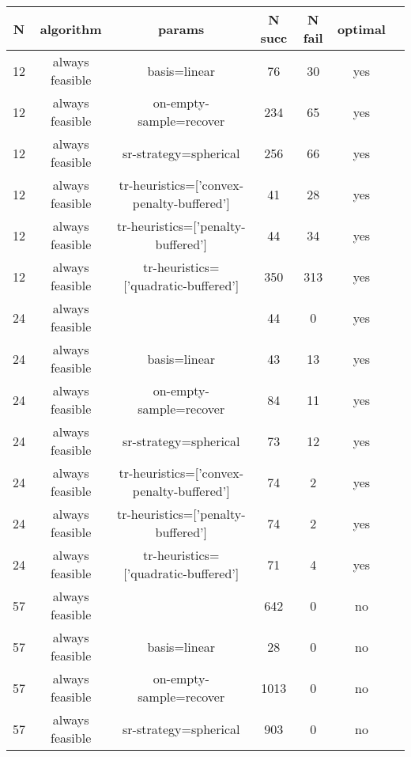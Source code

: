 \begin{footnotesize}
\begin{center}
\begin{longtable}{ccccccc}
  N &       algorithm &                                    params & N succ & N fail & optimal\\
\hline
\endhead
 12 & always feasible &                              basis=linear &     76 &     30 &     yes\\
 12 & always feasible &                   on-empty-sample=recover &    234 &     65 &     yes\\
 12 & always feasible &                     sr-strategy=spherical &    256 &     66 &     yes\\
 12 & always feasible & tr-heuristics=['convex-penalty-buffered'] &     41 &     28 &     yes\\
 12 & always feasible &        tr-heuristics=['penalty-buffered'] &     44 &     34 &     yes\\
 12 & always feasible &      tr-heuristics=['quadratic-buffered'] &    350 &    313 &     yes\\
 24 & always feasible &                                           &     44 &      0 &     yes\\
 24 & always feasible &                              basis=linear &     43 &     13 &     yes\\
 24 & always feasible &                   on-empty-sample=recover &     84 &     11 &     yes\\
 24 & always feasible &                     sr-strategy=spherical &     73 &     12 &     yes\\
 24 & always feasible & tr-heuristics=['convex-penalty-buffered'] &     74 &      2 &     yes\\
 24 & always feasible &        tr-heuristics=['penalty-buffered'] &     74 &      2 &     yes\\
 24 & always feasible &      tr-heuristics=['quadratic-buffered'] &     71 &      4 &     yes\\
 57 & always feasible &                                           &    642 &      0 &      no\\
 57 & always feasible &                              basis=linear &     28 &      0 &      no\\
 57 & always feasible &                   on-empty-sample=recover &   1013 &      0 &      no\\
 57 & always feasible &                     sr-strategy=spherical &    903 &      0 &      no\\

\end{longtable}
\end{center}
\end{footnotesize}
